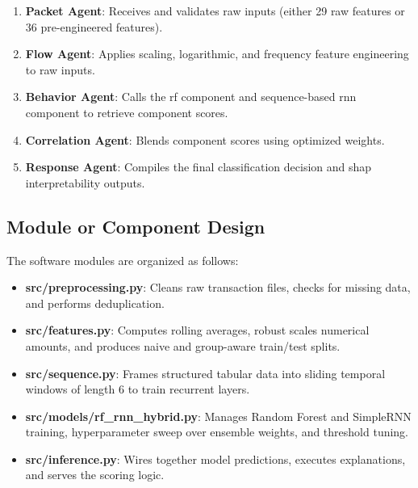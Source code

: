 \begin{enumerate}
    \item \textbf{Packet Agent}: Receives and validates raw inputs (either 29 raw features or 36 pre-engineered features).
    \item \textbf{Flow Agent}: Applies scaling, logarithmic, and frequency feature engineering to raw inputs.
    \item \textbf{Behavior Agent}: Calls the \gls{rf} component and sequence-based \gls{rnn} component to retrieve component scores.
    \item \textbf{Correlation Agent}: Blends component scores using optimized weights.
    \item \textbf{Response Agent}: Compiles the final classification decision and \gls{shap} interpretability outputs.
\end{enumerate}

\subsection{Module or Component Design}
The software modules are organized as follows:
\begin{itemize}
    \item \textbf{src/preprocessing.py}: Cleans raw transaction files, checks for missing data, and performs deduplication.
    \item \textbf{src/features.py}: Computes rolling averages, robust scales numerical amounts, and produces naive and group-aware train/test splits.
    \item \textbf{src/sequence.py}: Frames structured tabular data into sliding temporal windows of length 6 to train recurrent layers.
    \item \textbf{src/models/rf\_rnn\_hybrid.py}: Manages Random Forest and SimpleRNN training, hyperparameter sweep over ensemble weights, and threshold tuning.
    \item \textbf{src/inference.py}: Wires together model predictions, executes explanations, and serves the scoring logic.
\end{itemize}

